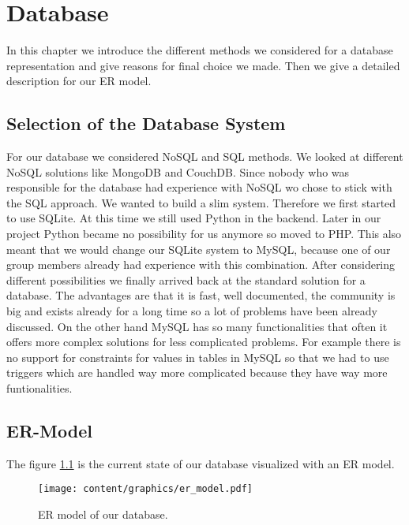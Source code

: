 \chapter{Database}

In this chapter we introduce the different methods we considered for a database representation and give reasons for final choice we made. Then we give a detailed description for our ER model.

\section{Selection of the Database System}
For our database we considered NoSQL and SQL methods. We looked at different NoSQL solutions like MongoDB and CouchDB. Since nobody who was responsible for the database had experience with NoSQL wo chose to stick with the SQL approach. We  wanted to build a slim system. Therefore we first started to use SQLite. At this time we still used Python in the backend. Later in our project Python became no possibility for us anymore so moved to PHP. This also meant that we would change our SQLite system to MySQL, because one of our group members already had experience with this combination. After considering different possibilities we finally arrived back at the standard solution for a database. The advantages are that it is fast, well documented, the community is big and exists already for a long time so a lot of problems have been already discussed. On the other hand MySQL has so many functionalities that often it offers more complex solutions for less complicated problems. For example there is no support for constraints for values in tables in MySQL so that we had to use triggers which are handled way more complicated because they have way more funtionalities.
\section{ER-Model}
    The figure \ref{fig:er_model} is the current state of our database visualized with an ER model.

	\begin{figure}[h!]
		\centering
			\texttt{[image: content/graphics/er\_model.pdf]}
		\caption{ER model of our database.}
        \label{fig:er_model}
	\end{figure}

